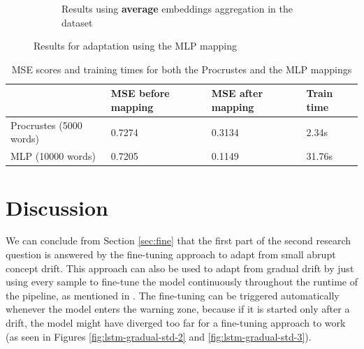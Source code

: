 \documentclass[12pt]{extreport}
\begin{document}
\begin{figure}[H]
\begin{subfigure}{.49\textwidth}
\caption{Results using \textbf{average} embeddings aggregation in the dataset}
\label{fig:mlp-average}
\end{subfigure}
\caption{Results for adaptation using the MLP mapping}
\label{fig:mlp-results}
\end{figure}

\begin{table}[H]
\centering
\begin{tabular}{|l|l|l|l|}
\hline
                  & MSE before mapping & MSE after mapping & Train time \\ \hline
Procrustes (5000 words) & 0.7274             & 0.3134            & 2.34s      \\ \hline
MLP (10000 words)       & 0.7205             & 0.1149            & 31.76s     \\ \hline
\end{tabular}
\caption{MSE scores and training times for both the Procrustes and the MLP mappings}
\label{table:maps}
\end{table}

\section{Discussion}

We can conclude from Section \ref{sec:fine} that the first part of the second research question is answered by the fine-tuning approach to adapt from small abrupt concept drift. This approach can also be used to adapt from gradual drift by just using every sample to fine-tune the model continuously throughout the runtime of the pipeline, as mentioned in \cite{fine-tuning-cd-image}. The fine-tuning can be triggered automatically whenever the model enters the warning zone, because if it is started only after a drift, the model might have diverged too far for a fine-tuning approach to work (as seen in Figures \ref{fig:lstm-gradual-std-2} and \ref{fig:lstm-gradual-std-3}).
\end{document}
